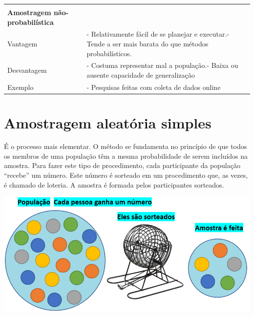 \documentclass[
]{book}
\begin{document}
\begin{longtable}[]{@{}ll@{}}
\begin{minipage}[t]{0.51\columnwidth}
\end{minipage}\tabularnewline
\begin{minipage}[t]{0.43\columnwidth}\raggedright
\textbf{Amostragem não-probabilística}\strut
\end{minipage} & \begin{minipage}[t]{0.51\columnwidth}\raggedright
\strut
\end{minipage}\tabularnewline
\begin{minipage}[t]{0.43\columnwidth}\raggedright
Vantagem\strut
\end{minipage} & \begin{minipage}[t]{0.51\columnwidth}\raggedright
- Relativamente fácil de se planejar e executar.- Tende a ser mais barata do que métodos probabilísticos.\strut
\end{minipage}\tabularnewline
\begin{minipage}[t]{0.43\columnwidth}\raggedright
Desvantagem\strut
\end{minipage} & \begin{minipage}[t]{0.51\columnwidth}\raggedright
- Costuma representar mal a população.- Baixa ou ausente capacidade de generalização\strut
\end{minipage}\tabularnewline
\begin{minipage}[t]{0.43\columnwidth}\raggedright
Exemplo\strut
\end{minipage} & \begin{minipage}[t]{0.51\columnwidth}\raggedright
- Pesquisas feitas com coleta de dados online\strut
\end{minipage}\tabularnewline
\bottomrule
\end{longtable}

\hypertarget{amostragem-aleatuxf3ria-simples}{%
\section{Amostragem aleatória simples}\label{amostragem-aleatuxf3ria-simples}}

É o processo mais elementar. O método se fundamenta no princípio de que todos os membros de uma população têm a mesma probabilidade de serem incluídos na amostra. Para fazer este tipo de procedimento, cada participante da população ``recebe'' um número. Este número é sorteado em um procedimento que, as vezes, é chamado de loteria. A amostra é formada pelos participantes sorteados.

\includegraphics{./img/cap_aas.png}
\end{document}
